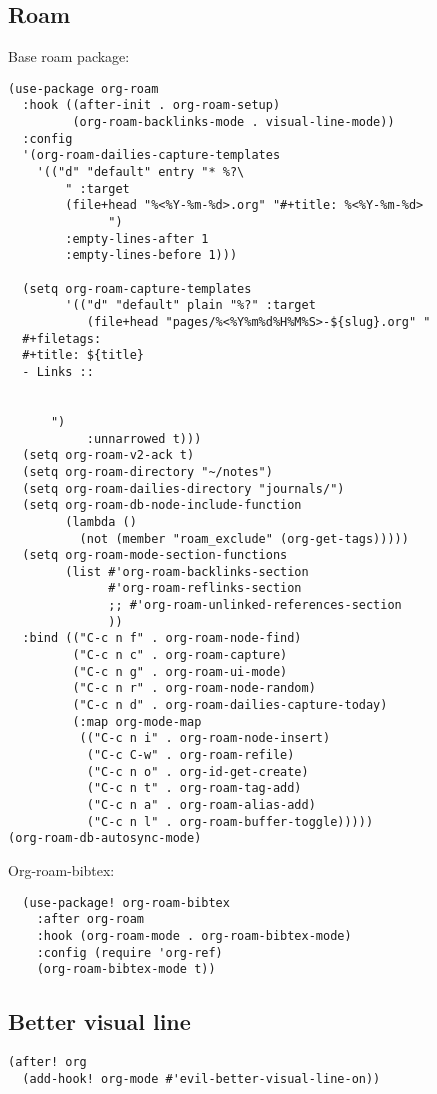 \documentclass[11pt]{article}
\begin{document}
\subsection{Roam}
\label{sec:org780afd1}
Base roam package:
\begin{verbatim}
(use-package org-roam
  :hook ((after-init . org-roam-setup)
         (org-roam-backlinks-mode . visual-line-mode))
  :config
  '(org-roam-dailies-capture-templates
    '(("d" "default" entry "* %?\
        " :target
        (file+head "%<%Y-%m-%d>.org" "#+title: %<%Y-%m-%d>
              ")
        :empty-lines-after 1
        :empty-lines-before 1)))

  (setq org-roam-capture-templates
        '(("d" "default" plain "%?" :target
           (file+head "pages/%<%Y%m%d%H%M%S>-${slug}.org" "
  #+filetags:
  #+title: ${title}
  - Links ::


      ")
           :unnarrowed t)))
  (setq org-roam-v2-ack t)
  (setq org-roam-directory "~/notes")
  (setq org-roam-dailies-directory "journals/")
  (setq org-roam-db-node-include-function
        (lambda ()
          (not (member "roam_exclude" (org-get-tags)))))
  (setq org-roam-mode-section-functions
        (list #'org-roam-backlinks-section
              #'org-roam-reflinks-section
              ;; #'org-roam-unlinked-references-section
              ))
  :bind (("C-c n f" . org-roam-node-find)
         ("C-c n c" . org-roam-capture)
         ("C-c n g" . org-roam-ui-mode)
         ("C-c n r" . org-roam-node-random)
         ("C-c n d" . org-roam-dailies-capture-today)
         (:map org-mode-map
          (("C-c n i" . org-roam-node-insert)
           ("C-c C-w" . org-roam-refile)
           ("C-c n o" . org-id-get-create)
           ("C-c n t" . org-roam-tag-add)
           ("C-c n a" . org-roam-alias-add)
           ("C-c n l" . org-roam-buffer-toggle)))))
(org-roam-db-autosync-mode)
\end{verbatim}

Org-roam-bibtex:
\begin{verbatim}
  (use-package! org-roam-bibtex
    :after org-roam
    :hook (org-roam-mode . org-roam-bibtex-mode)
    :config (require 'org-ref)
    (org-roam-bibtex-mode t))
\end{verbatim}

\subsection{Better visual line}
\label{sec:org83413bc}
\begin{verbatim}
(after! org
  (add-hook! org-mode #'evil-better-visual-line-on))
\end{verbatim}
\end{document}
